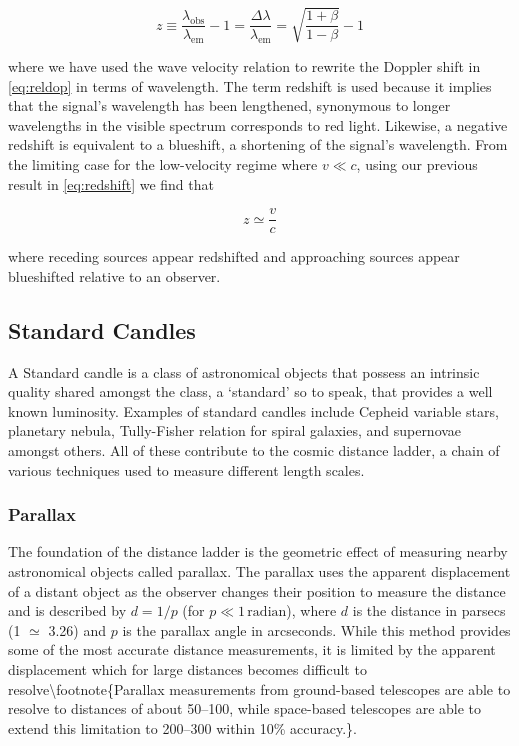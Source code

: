 \begin{equation}z \equiv \frac{ \lambda_\text{obs}}{\lambda_\text{em}} - 1 =  \frac{\Delta\lambda}{\lambda_\text{em}} = \sqrt{\frac{1 + \beta}{1-\beta}} - 1\label{eq:redshift}\end{equation}

\noindent where we have used the wave velocity relation to rewrite the
Doppler shift in \cref{eq:reldop} in terms of wavelength.
The term redshift is used because it implies that the signal's
wavelength has been lengthened, synonymous to longer wavelengths in the
visible spectrum corresponds to red light. Likewise, a negative redshift
is equivalent to a blueshift, a shortening of the signal's wavelength.
From the limiting case for the low-velocity regime where \(v \ll c\),
using our previous result in \cref{eq:redshift} we find
that

\begin{equation}z \simeq \frac{v}{c}\label{eq:lowvelocity}\end{equation}

\noindent where receding sources appear redshifted and approaching
sources appear blueshifted relative to an observer.

\subsection{Standard Candles}\label{standard-candles}

A Standard candle is a class of astronomical objects that possess an
intrinsic quality shared amongst the class, a `standard' so to speak,
that provides a well known luminosity. Examples of standard candles
include Cepheid variable stars, planetary nebula, Tully-Fisher relation
for spiral galaxies, and supernovae amongst others. All of these
contribute to the cosmic distance ladder, a chain of various techniques
used to measure different length scales.

\subsubsection{Parallax}\label{parallax}

The foundation of the distance ladder is the geometric effect of
measuring nearby astronomical objects called parallax. The parallax uses
the apparent displacement of a distant object as the observer changes
their position to measure the distance and is described by \(d = 1 / p\)
(for \(p \ll 1\, \text{radian}\)), where \(d\) is the distance in
parsecs (\SI{1}{\parsec} \(\simeq\) \SI{3.26}{\lightyear}) and \(p\) is
the parallax angle in arcseconds. While this method provides some of the
most accurate distance measurements, it is limited by the apparent
displacement which for large distances becomes difficult to
resolve\textbackslash{}footnote\{Parallax measurements from ground-based
telescopes are able to resolve to distances of about
\SIrange{50}{100}{\parsec}, while space-based telescopes are able to
extend this limitation to \SIrange{200}{300}{\parsec} within 10\%
accuracy.\}.

